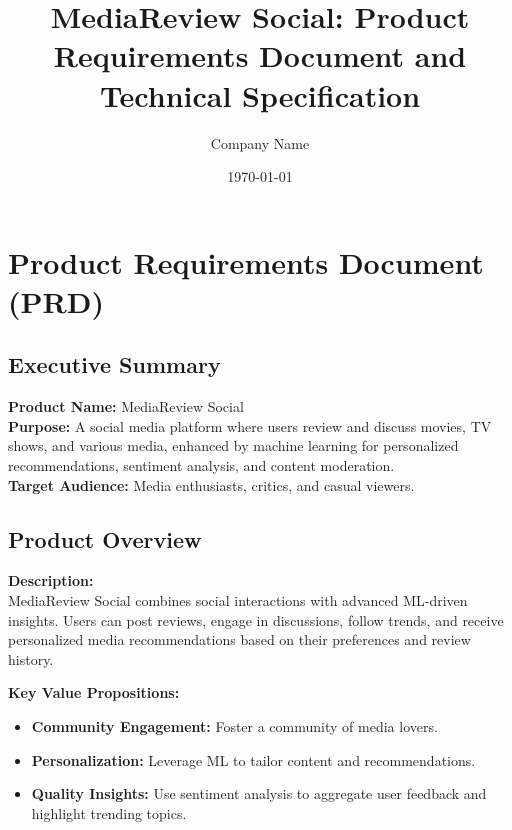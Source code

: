 \documentclass[11pt]{article}
\title{MediaReview Social: Product Requirements Document and Technical Specification}
\author{Company Name}
\date{\today}
\begin{document}
\maketitle
\tableofcontents
\newpage

\section{Product Requirements Document (PRD)}

\subsection{Executive Summary}
\textbf{Product Name:} MediaReview Social\\[1mm]
\textbf{Purpose:} A social media platform where users review and discuss movies, TV shows, and various media, enhanced by machine learning for personalized recommendations, sentiment analysis, and content moderation.\\[1mm]
\textbf{Target Audience:} Media enthusiasts, critics, and casual viewers.

\subsection{Product Overview}
\textbf{Description:}\\
MediaReview Social combines social interactions with advanced ML-driven insights. Users can post reviews, engage in discussions, follow trends, and receive personalized media recommendations based on their preferences and review history.

\textbf{Key Value Propositions:}
\begin{itemize}[noitemsep]
    \item \textbf{Community Engagement:} Foster a community of media lovers.
    \item \textbf{Personalization:} Leverage ML to tailor content and recommendations.
    \item \textbf{Quality Insights:} Use sentiment analysis to aggregate user feedback and highlight trending topics.
\end{itemize}
\end{document}
